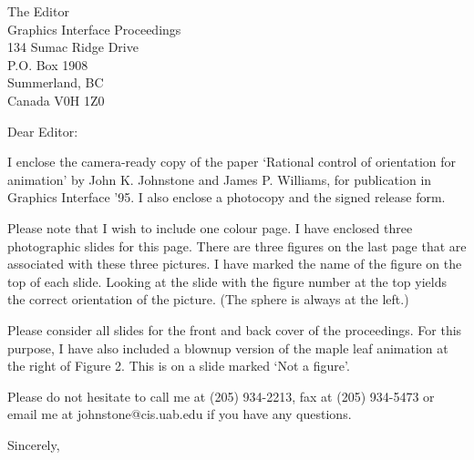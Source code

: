 \address{\ \ }
\signature{Prof. John K. Johnstone}

\begin{letter}
{The Editor\\
Graphics Interface Proceedings\\
134 Sumac Ridge Drive\\
P.O. Box 1908\\
Summerland, BC\\
Canada  V0H 1Z0
}

\opening{Dear Editor:}

I enclose the camera-ready copy of the paper 
`Rational control of orientation for animation' 
by John K. Johnstone and James P. Williams,
for publication in Graphics Interface '95.
I also enclose a photocopy and the signed release form.

Please note that I wish to include one colour page.
I have enclosed three photographic slides for this page.
There are three figures on the last page that are
associated with these three pictures.
I have marked the name of the figure on the top of each slide.
Looking at the slide with the figure number at the top
yields the correct orientation of the picture.
(The sphere is always at the left.)

Please consider all slides for the front and back cover of the
proceedings.  For this purpose, I have also included a blownup
version of the maple leaf animation at the right of Figure 2.
This is on a slide marked `Not a figure'.

Please do not hesitate to call me at (205) 934-2213,
fax at (205) 934-5473 or
email me at johnstone@cis.uab.edu if you have any questions.

	
\closing{Sincerely,}
\end{letter}

